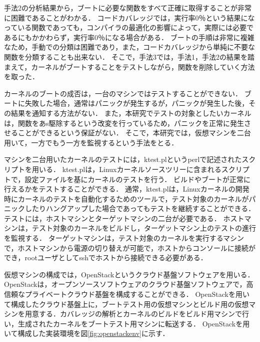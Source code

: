 \documentclass[graduation-thesis]{mlarticle}
\begin{document}
手法2の分析結果から，ブートに必要な関数をすべて正確に取得することが非常に困難であることがわかる．
コードカバレッジでは，実行率0％という結果になっている関数であっても，コンパイラの最適化の影響によって，実際には必要であるにもかかわらず，実行率0％になる場合がある．
ブートの手順は非常に複雑なため，手動での分類は困難であり，また，コードカバレッジから単純に不要な関数を分類することも出来ない．
そこで，手法3では，手法1，手法2の結果を踏まえて，カーネルがブートすることをテストしながら，関数を削除していく方法を取った．

カーネルのブートの成否は，一台のマシンではテストすることができない．
ブートに失敗した場合，通常はパニックが発生するが，パニックが発生した後，その結果を通知する方法がない．
また，本研究でテストの対象としたいカーネルは，関数をあs駆除するという改変を行っているため，パニックを正常に発生させることができるという保証がない．
そこで，本研究では，仮想マシンを二台用いて，一方でもう一方を監視するという手法をとる．

マシンを二台用いたカーネルのテストには，ktest.plというperlで記述されたスクリプトを用いる．
ktest.plは，Linuxカーネルソースツリーに含まれるスクリプトで，設定ファイルを基にカーネルのテストを行う．
ビルドやブートが正常に行えるかをテストすることができる．
通常，ktest.plは，Linuxカーネルの開発時にカーネルのテストを自動化するためのツールで，テスト対象のカーネルがパニックしたりハングアップした場合であってもテストを継続することができる．
テストには，ホストマシンとターゲットマシンの二台が必要である．
ホストマシンは，テスト対象のカーネルをビルドし，ターゲットマシン上のテストの進行を監視する．
ターゲットマシンは，テスト対象のカーネルを実行するマシンで，ホストマシンから電源の切り替えが可能で，ホストからコンソールに接続ができ，rootユーザとしてsshでホストから接続できる必要がある．

仮想マシンの構成では，OpenStackというクラウド基盤ソフトウェアを用いる．
OpenStackは，オープンソースソフトウェアのクラウド基盤ソフトウェアで，高信頼なプライベートクラウド基盤を構成することができる．
OpenStackを用いて構成したクラウド基盤上に，ブートテスト用の仮想マシンとビルド用の仮想マシンを用意する．カバレッジの解析とカーネルのビルドをビルド用マシンで行い，生成されたカーネルをブートテスト用マシンに転送する．
OpenStackを用いて構成した実装環境を図\ref{fig:openstackenv}に示す．
\end{document}
